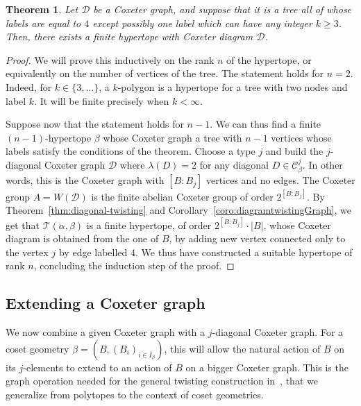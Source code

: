 \documentclass[11pt,letterpaper]{amsart}
\newtheorem{thm}[prop]{Theorem}
\newcommand{\CC}{\mathcal{C}}
\newcommand{\TT}{\mathcal{T}}
\begin{document}
\begin{thm}
     Let $\mathcal{D}$ be a Coxeter graph, and suppose that it is a tree all of whose labels are equal to $4$ except possibly one label which can have any integer $k\geq 3$. Then, there exists a finite hypertope with Coxeter diagram $\mathcal{D}$.
\end{thm}
\begin{proof} 
    We will prove this inductively on the rank $n$ of the hypertope, or equivalently on the number of vertices of the tree.
    The statement holds for $n=2$. Indeed, for $k\in\{3,\ldots\}$, a $k$-polygon is a hypertope for a tree with two nodes and label $k$. It will be finite precisely when $k < \infty$. 
    
    Suppose now that the statement holds for $n-1$. We can thus find a finite $(n-1)$-hypertope $\beta$ whose Coxeter graph a tree with $n-1$ vertices whose labels satisfy the conditions of the theorem.
    Choose a type $j$ and build the $j$-diagonal Coxeter graph $\mathcal{D}$ where $\lambda(D) = 2 $ for any diagonal $D\in \CC^{j}_\beta$. In other words, this is the Coxeter graph with $[B:B_j]$ vertices and no edges. The Coxeter group $A=W(\mathcal{D})$ is the finite abelian Coxeter group of order $2^{[B:B_j]}$. By Theorem~\ref{thm:diagonal-twisting} and Corollary~\ref{coro:diagramtwistingGraph}, we get that $\TT(\alpha,\beta)$ is a finite hypertope, of order $2^{[B:B_j]}\cdot |B|$, whose Coxeter diagram is obtained from the one of $B$, by adding new vertex connected only to the vertex $j$ by edge labelled $4$. We thus have constructed a suitable hypertope of rank $n$, concluding the induction step of the proof.

\end{proof}



\subsection{Extending a Coxeter graph}\label{subsec:extension}

We now combine a given Coxeter graph with a $j$-diagonal Coxeter graph. For a coset geometry $\beta=(B,(B_i)_{i\in I_\beta})$, this will allow the natural action of $B$ on its $j$-elements to extend to an action of $B$ on a bigger Coxeter graph.
This is the graph operation needed for the general twisting construction in~\cite[Section~8B]{ARP}, that we generalize from polytopes to the context of coset geometries.
\end{document}
